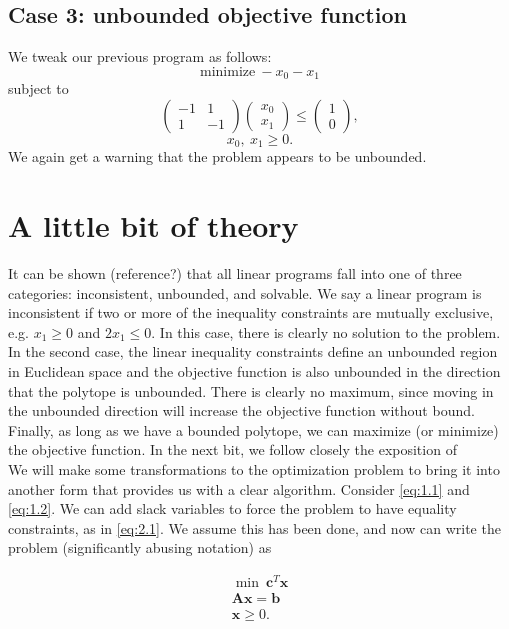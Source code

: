 \documentclass[12pt,english]{article}
\begin{document}
\subsection*{Case 3: unbounded objective function}
We tweak our previous program as follows:
$$
\text{minimize} ~-x_0 - x_1
$$
subject to
$$
\left(
\begin{array}{cc}
-1	&	1	\\
1	&	-1	
\end{array}
\right)
\left(
\begin{array}{c}
x_0 \\
x_1
\end{array}
\right)
\leq 
\left(
\begin{array}{c}
1 	\\
0
\end{array}
\right),
$$
$$
x_0,~x_1 \geq 0.
$$
We again get a warning that the problem appears to be unbounded.

\section{A little bit of theory}

It can be shown (reference?) that all linear programs fall into one of three categories: inconsistent, unbounded, and solvable.  We say a linear program is inconsistent if two or more of the inequality constraints are mutually exclusive, e.g. $x_1 \geq 0$ and $2 x_1 \leq 0$.  In this case, there is clearly no solution to the problem.   In the second case, the linear inequality constraints define an unbounded region in Euclidean space and the objective function is also unbounded in the direction that the polytope is unbounded.  There is clearly no maximum, since moving in the unbounded direction will increase the objective function without bound.  Finally, as long as we have a bounded polytope, we can maximize (or minimize) the objective function.  In the next bit, we follow closely the exposition of \cite{BaJaSh:1990} \\

We will make some transformations to the optimization problem to bring it into another form that provides us with a clear algorithm.  Consider \eqref{eq:1.1} and \eqref{eq:1.2}.  We can add slack variables to force the problem to have equality constraints, as in \eqref{eq:2.1}.  We assume this has been done, and now can write the problem (significantly abusing notation) as 

\begin{equation}\label{eq:4.1}
\begin{array}{l}
\min~\mathbf{c}^T \mathbf{x} \\
\mathbf{A} \mathbf{x} = \mathbf{b} \\
\mathbf{x} \geq 0.
\end{array}
\end{equation}
\end{document}
